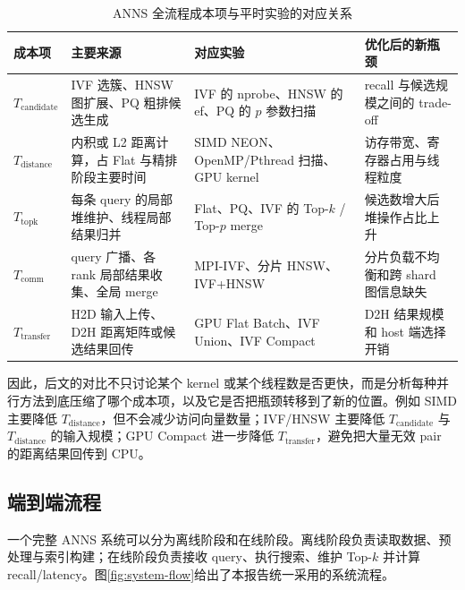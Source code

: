\documentclass[a4paper]{article}
\begin{document}
\begin{table}[H]
\centering
\scriptsize
\caption{ANNS 全流程成本项与平时实验的对应关系}
\label{tab:cost-decomposition}
\begin{tabularx}{\textwidth}{lXlX}
\toprule
成本项 & 主要来源 & 对应实验 & 优化后的新瓶颈 \\
\midrule
$T_{\mathrm{candidate}}$ & IVF 选簇、HNSW 图扩展、PQ 粗排候选生成 & IVF 的 nprobe、HNSW 的 ef、PQ 的 $p$ 参数扫描 & recall 与候选规模之间的 trade-off \\
$T_{\mathrm{distance}}$ & 内积或 L2 距离计算，占 Flat 与精排阶段主要时间 & SIMD NEON、OpenMP/Pthread 扫描、GPU kernel & 访存带宽、寄存器占用与线程粒度 \\
$T_{\mathrm{topk}}$ & 每条 query 的局部堆维护、线程局部结果归并 & Flat、PQ、IVF 的 Top-$k$ / Top-$p$ merge & 候选数增大后堆操作占比上升 \\
$T_{\mathrm{comm}}$ & query 广播、各 rank 局部结果收集、全局 merge & MPI-IVF、分片 HNSW、IVF+HNSW & 分片负载不均衡和跨 shard 图信息缺失 \\
$T_{\mathrm{transfer}}$ & H2D 输入上传、D2H 距离矩阵或候选结果回传 & GPU Flat Batch、IVF Union、IVF Compact & D2H 结果规模和 host 端选择开销 \\
\bottomrule
\end{tabularx}
\end{table}

因此，后文的对比不只讨论某个 kernel 或某个线程数是否更快，而是分析每种并行方法到底压缩了哪个成本项，以及它是否把瓶颈转移到了新的位置。例如 SIMD 主要降低 $T_{\mathrm{distance}}$，但不会减少访问向量数量；IVF/HNSW 主要降低 $T_{\mathrm{candidate}}$ 与 $T_{\mathrm{distance}}$ 的输入规模；GPU Compact 进一步降低 $T_{\mathrm{transfer}}$，避免把大量无效 pair 的距离结果回传到 CPU。

\subsection{端到端流程}

一个完整 ANNS 系统可以分为离线阶段和在线阶段。离线阶段负责读取数据、预处理与索引构建；在线阶段负责接收 query、执行搜索、维护 Top-$k$ 并计算 recall/latency。图\ref{fig:system-flow}给出了本报告统一采用的系统流程。
\end{document}
